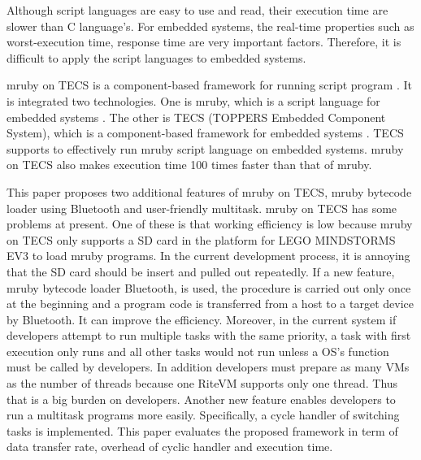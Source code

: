 \documentclass[conference,compsoc]{IEEEtran}
\begin{document}
Although script languages are easy to use and read, their execution time are slower than C language's.
For embedded systems, the real-time properties such as worst-execution time, response time are very important factors.
Therefore, it is difficult to apply the script languages to embedded systems.

mruby on TECS is a component-based framework for running script program \cite{7153813}.
It is integrated two technologies.
One is mruby, which is a script language for embedded systems \cite{5959588}.
The other is TECS (TOPPERS Embedded Component System), which is a component-based framework for embedded systems \cite{4208825}.
TECS supports to effectively run mruby script language on embedded systems.
mruby on TECS also makes execution time 100 times faster than that of mruby.

This paper proposes two additional features of mruby on TECS, mruby bytecode loader using Bluetooth and user-friendly multitask.
mruby on TECS has some problems at present.
One of these is that working efficiency is low because mruby on TECS only supports a SD card in the platform for LEGO MINDSTORMS EV3 to load mruby programs.
In the current development process, it is annoying that the SD card should be insert and pulled out repeatedly.
If a new feature, mruby bytecode loader Bluetooth, is used, the procedure is carried out only once at the beginning and a program code is transferred from a host to a target device by Bluetooth.
It can improve the efficiency.
Moreover, in the current system if developers attempt to run multiple tasks with the same priority, a task with first execution only runs and all other tasks would not run unless a OS's function must be called by developers.
In addition developers must prepare as many VMs as the number of threads because one RiteVM supports only one thread.
Thus that is a big burden on developers.
Another new feature enables developers to run a multitask programs more easily.
Specifically, a cycle handler of switching tasks is implemented.
This paper evaluates the proposed framework in term of data transfer rate, overhead of cyclic handler and execution time.
\end{document}
